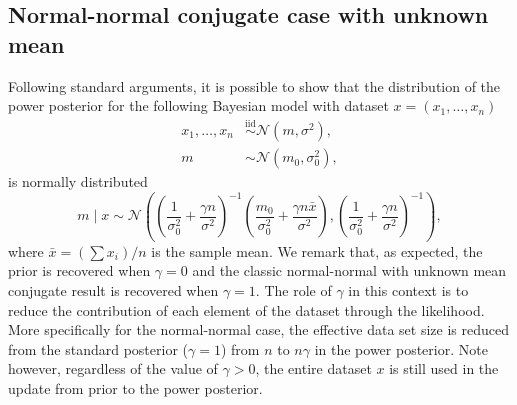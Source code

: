 \documentclass[12pt]{article}
\begin{document}
\subsection{Normal-normal conjugate case with unknown mean}
Following standard arguments, it is possible to show that the distribution of
the power posterior for the following Bayesian model with dataset $x = (x_1,
\ldots, x_n)$
\begin{subequations}
\begin{align}
	x_1, \ldots, x_n &\overset{\mathrm{iid}}{\sim} \mathcal{N}(m, \sigma^2), \\
m &\sim \mathcal{N}(m_0, \sigma_0^2),
\end{align}
\end{subequations}
is normally distributed
\begin{equation*}
m \;|\; x \sim \mathcal{N} \left( \left( \frac{1}{\sigma_0^2} + \frac{\gamma n}{\sigma^2} \right)^{-1} \left(\frac{m_0}{\sigma_0^2} + \frac{\gamma n \bar{x}}{\sigma^2}  \right), \left( \frac{1}{\sigma_0^2} + \frac{\gamma n}{\sigma^2} \right)^{-1} \right),
\end{equation*}
where $\bar{x} = (\sum x_i)/ n$ is the sample mean. We remark that, as
expected, the prior is recovered when $\gamma = 0$ and the classic
normal-normal with unknown mean conjugate result is recovered when $\gamma =
1$. The role of $\gamma$ in this context is to reduce the contribution of each
element of the dataset through the likelihood. More specifically for the
normal-normal case, the effective data set size is reduced from the standard
posterior ($\gamma = 1$) from $n$ to $n \gamma$ in the power posterior. Note
however, regardless of the value of $\gamma > 0$, the entire dataset $x$ is
still used in the update from prior to the power posterior.
\end{document}
